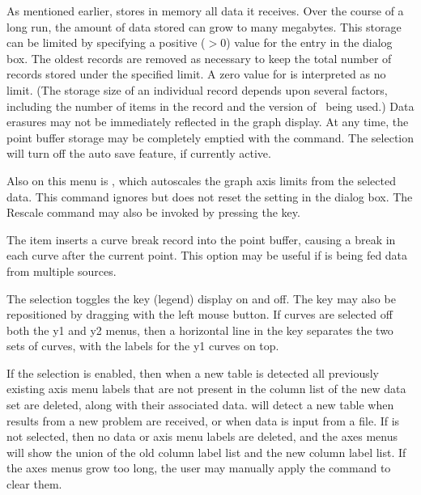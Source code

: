 As mentioned earlier,  stores in memory all data it
receives.  Over the course of a long run, the amount of data stored can
grow to many megabytes.  This storage can be limited
by specifying a positive ($>0$) value for the 
entry in the {} dialog box.  The oldest
records are removed as necessary to keep the total number of records
stored under the specified limit.  A zero value for  is interpreted as no limit.  (The storage size of an individual
record depends upon several factors, including the number of items in
the record and the version of \Tcl\ being used.)  Data erasures may not
be immediately reflected in the graph display.  At any time, the point
buffer storage may be completely emptied with the  command.  The  selection
will turn off the auto save feature, if currently active.

Also on this menu is , which autoscales the
graph axis limits from the selected data.  This command ignores but does
not reset the  setting in the  dialog box.  The Rescale command may also be invoked by
pressing the  key.

The  item inserts a curve break record
into the point buffer, causing a break in each curve after the current
point.  This option may be useful if  is being fed data
from multiple sources.

The  selection toggles the key (legend) display on
and off.  The key may also be repositioned by dragging with the left
mouse button.  If curves are selected off both the y1 and y2 menus, then
a horizontal line in the key separates the two sets of curves, with the
labels for the y1 curves on top.

If the  selection is enabled, then when a
new table is detected all previously existing axis menu labels that are
not present in the column list of the new data set are deleted, along
with their associated data.   will detect a new table when
results from a new problem are received, or when data is input from a
file.  If  is not selected, then no data or
axis menu labels are deleted, and the axes menus will show the union of
the old column label list and the new column label list.  If the axes
menus grow too long, the user may manually apply the
 command to clear them.

